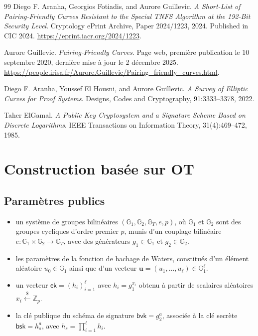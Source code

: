 \documentclass[10pt,a4paper]{article}
\theoremstyle{definition}
\theoremstyle{plain}
\theoremstyle{remark}
\newcommand{\sample}{\xleftarrow{\$}}
\begin{document}
\begin{thebibliography}{99}
Diego F. Aranha, Georgios Fotiadis, and Aurore Guillevic.
\textit{A Short-List of Pairing-Friendly Curves Resistant to the Special TNFS Algorithm at the 192-Bit Security Level}.
Cryptology ePrint Archive, Paper 2024/1223, 2024.
Published in CIC 2024.
\url{https://eprint.iacr.org/2024/1223}.

Aurore Guillevic.
\textit{Pairing-Friendly Curves}.
Page web, première publication le 10 septembre 2020,
dernière mise à jour le 2 décembre 2025.
\url{https://people.irisa.fr/Aurore.Guillevic/Pairing_friendly_curves.html}.

Diego F. Aranha, Youssef El Housni, and Aurore Guillevic.
\textit{A Survey of Elliptic Curves for Proof Systems}.
Designs, Codes and Cryptography, 91:3333--3378, 2022.

Taher ElGamal.
\textit{A Public Key Cryptosystem and a Signature Scheme Based on Discrete Logarithms}.
IEEE Transactions on Information Theory, 31(4):469--472, 1985.

\end{thebibliography}



\newpage
\appendix

\section{Construction basée sur OT}\label{app:ot}

\subsection{Paramètres publics}
\begin{itemize}
    \item un système de groupes bilinéaires $(\mathbb{G}_1,\mathbb{G}_2,\mathbb{G}_T,e,p)$,
    où $\mathbb{G}_1$ et $\mathbb{G}_2$ sont des groupes cycliques d'ordre premier $p$, munis d'un couplage bilinéaire
    $e:\mathbb{G}_1\times\mathbb{G}_2\rightarrow\mathbb{G}_T$,
    avec des générateurs $g_1\in\mathbb{G}_1$ et $g_2\in\mathbb{G}_2$.

    \item les paramètres de la fonction de hachage de Waters, constitués d'un élément aléatoire
    $u_0\in\mathbb{G}_1$ ainsi que d'un vecteur $\mathbf{u}=(u_1,\ldots,u_\ell)\in\mathbb{G}_1^\ell$.

    \item un vecteur $\mathsf{ek}=(h_i)_{i=1}^{\ell}$ avec $h_i=g_1^{x_i}$ obtenu à partir de scalaires aléatoires $x_i\sample\mathbb{Z}_p$.

    \item la clé publique du schéma de signature $\mathsf{bvk}=g_2^a$, associée à la clé secrète $\mathsf{bsk}=h_s^a$, avec $h_s=\prod_{i=1}^{\ell} h_i$.
\end{itemize}
\end{document}
